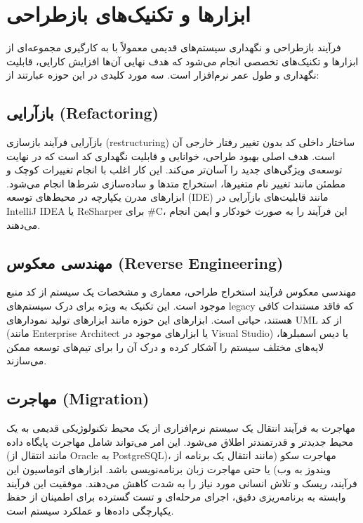 \section{ابزارها و تکنیک‌های بازطراحی}
\label{section:5}

فرآیند بازطراحی و نگهداری سیستم‌های قدیمی معمولاً با به کارگیری مجموعه‌ای از ابزارها و تکنیک‌های تخصصی انجام می‌شود که هدف نهایی آن‌ها افزایش کارایی، قابلیت نگهداری و طول عمر نرم‌افزار است. سه مورد کلیدی در این حوزه عبارتند از:

\subsection{بازآرایی (Refactoring)}
بازآرایی فرآیند بازسازی (restructuring) ساختار داخلی کد بدون تغییر رفتار خارجی آن است. هدف اصلی بهبود طراحی، خوانایی و قابلیت نگهداری کد است که در نهایت توسعه‌ی ویژگی‌های جدید را آسان‌تر می‌کند. این کار اغلب با انجام تغییرات کوچک و مطمئن مانند تغییر نام متغیرها، استخراج متدها و ساده‌سازی شرط‌ها انجام می‌شود. ابزارهای مدرن یکپارچه در محیط‌های توسعه (IDE) مانند قابلیت‌های بازآرایی در IntelliJ IDEA یا ReSharper برای \#C، این فرآیند را به صورت خودکار و ایمن انجام می‌دهند.

\subsection{مهندسی معکوس (Reverse Engineering)}
مهندسی معکوس فرآیند استخراج طراحی، معماری و مشخصات یک سیستم از کد منبع موجود است. این تکنیک به ویژه برای درک سیستم‌های legacy که فاقد مستندات کافی هستند، حیاتی است. ابزارهای این حوزه مانند ابزارهای تولید نمودارهای UML از کد (مانند Enterprise Architect یا ابزارهای موجود در Visual Studio) یا دیس اسمبلرها، لایه‌های مختلف سیستم را آشکار کرده و درک آن را برای تیم‌های توسعه ممکن می‌سازند.

\subsection{مهاجرت (Migration)}
مهاجرت به فرآیند انتقال یک سیستم نرم‌افزاری از یک محیط تکنولوژیکی قدیمی به یک محیط جدیدتر و قدرتمندتر اطلاق می‌شود. این امر می‌تواند شامل مهاجرت پایگاه داده (مانند انتقال از Oracle به PostgreSQL)، مهاجرت سکو (مانند انتقال یک برنامه از ویندوز به وب) یا حتی مهاجرت زبان برنامه‌نویسی باشد. ابزارهای اتوماسیون این فرآیند، ریسک و تلاش انسانی مورد نیاز را به شدت کاهش می‌دهند. موفقیت این فرآیند وابسته به برنامه‌ریزی دقیق، اجرای مرحله‌ای و تست گسترده برای اطمینان از حفظ یکپارچگی داده‌ها و عملکرد سیستم است.
